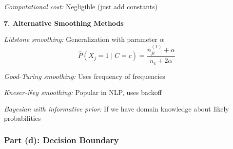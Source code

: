 \documentclass[12pt]{article}
\begin{document}
\begin{explanation}
\textit{Computational cost:} Negligible (just add constants)

\textbf{7. Alternative Smoothing Methods}

\textit{Lidstone smoothing:} Generalization with parameter $\alpha$
\[
\hat{P}(X_j = 1 \mid C = c) = \frac{n_{jc}^{(1)} + \alpha}{n_c + 2\alpha}
\]

\textit{Good-Turing smoothing:} Uses frequency of frequencies

\textit{Kneser-Ney smoothing:} Popular in NLP, uses backoff

\textit{Bayesian with informative prior:} If we have domain knowledge about likely probabilities
\end{explanation}

\subsubsection{Part (d): Decision Boundary}
\end{document}
